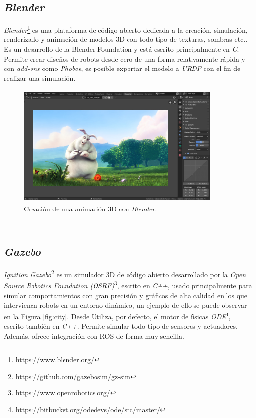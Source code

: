 \subsection{\textit{Blender}}
\label{subsection:blender}
\textit{Blender}\footnote{\url{https://www.blender.org/}} es una plataforma de código abierto dedicada a la creación, simulación, renderizado y animación de modelos 3D con todo tipo de texturas, sombras etc.. Es un desarrollo de la Blender Foundation y está escrito principalmente en \textit{C}. Permite crear diseños de robots desde cero de una forma relativamente rápida y con \textit{add-ons} como \textit{Phobos}, es posible exportar el modelo a \textit{URDF} con el fin de realizar una simulación\cite{phobos}.\\

\begin{figure} [h!]
	\begin{center}
		\includegraphics[width=10cm, height=6cm]{figs/blender}
	\end{center}
	\caption{Creación de una animación 3D con \textit{Blender}.}
	\label{fig:blender}
\end{figure}\

\subsection{\textit{Gazebo}}
\label{subsection:gazebo}
\textit{Ignition Gazebo}\footnote{\url{https://github.com/gazebosim/gz-sim}} es un simulador 3D de código abierto desarrollado por la \textit{Open Source Robotics Foundation (OSRF)}\footnote{\url{https://www.openrobotics.org/}}, escrito en \textit{C++}, usado principalmente para simular comportamientos con gran precisión y gráficos de alta calidad en los que intervienen robots en un entorno dinámico, un ejemplo de ello se puede observar en la Figura \ref{fig:city}. Desde  Utiliza, por defecto, el motor de físicas \textit{ODE}\footnote{\url{https://bitbucket.org/odedevs/ode/src/master/}}, escrito también en \textit{C++}. Permite simular todo tipo de sensores y actuadores. Además, ofrece integración con ROS de forma muy sencilla.\\


